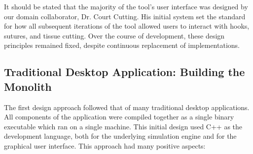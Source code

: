   It should be stated that the majority of the tool's user interface
  was designed by our domain collaborator, Dr. Court Cutting. His
  initial system set the standard for how all subsequent iterations of
  the tool allowed users to interact with hooks, sutures, and tissue
  cutting. Over the course of development, these design principles
  remained fixed, despite continuous replacement of implementations.
  

\subsection{Traditional Desktop Application: Building the Monolith}

The first design approach followed that of many traditional desktop
applications. All components of the application were compiled together
as a single binary executable which ran on a single machine. This
initial design used C++ as the development language, both for the
underlying simulation engine and for the graphical user
interface. This approach had many positive aspects:

